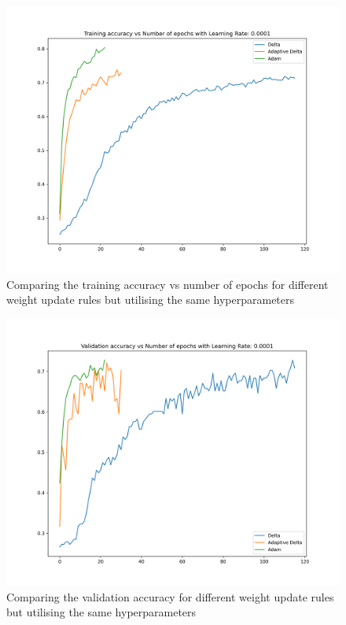 \documentclass[10pt,a4paper]{article}
\begin{document}
\begin{figure}%
    \centering
    \includegraphics[scale=0.6]{training_accuracy_0.0001.png}%
    \caption{Comparing the training accuracy vs number of epochs for different weight update rules but utilising the same hyperparameters}%
    \label{fig:10}%
\end{figure}

\begin{figure}%
    \centering
    \includegraphics[scale=0.6]{validation_accuracy_0.0001.png}%
    \caption{Comparing the validation accuracy for different weight update rules but utilising the same hyperparameters}%
    \label{fig:11}%
\end{figure}
\end{document}
